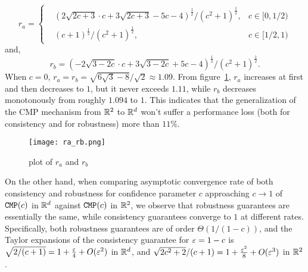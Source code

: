 \begin{equation*}
r_a=
\left\{
\begin{aligned}
&(2\sqrt{2c+3}\cdot c+3\sqrt{2c+3}-5c-4)^{\frac{1}{2}}/(c^2+1)^{\frac{1}{2}}, &c\in[0,1/2)\\
&(c+1)^{\frac{1}{2}}/(c^2+1)^{\frac{1}{2}},  &c\in[1/2,1)
\end{aligned}
\right.
\end{equation*}
and,
\begin{equation*}
r_b=(-2\sqrt{3-2c}\cdot c+3\sqrt{3-2c}+5c-4)^{\frac{1}{2}}/(c^2+1)^{\frac{1}{2}}.
\end{equation*}
When $c=0$, $r_a=r_b=\sqrt{6\sqrt{3}-8}/\sqrt{2}\approx1.09$. From figure~\ref{fig:plot of $r_a$ and $r_b$}, $r_a$ increases at first and then decreases to $1$, but it never exceeds $1.11$, while $r_b$ decreases monotonously from roughly $1.094$ to $1$. This indicates that the generalization of the CMP mechanism from $\mathbb{R}^2$ to $\mathbb{R}^d$ won't suffer a performance loss (both for consistency and for robustness) more than $11\%$.
\begin{figure}[htb] 
		\centering
		\texttt{[image: ra\_rb.png]}
		\caption{plot of $r_a$ and $r_b$}
\label{fig:plot of $r_a$ and $r_b$}		
\end{figure}

On the other hand, when comparing asymptotic convergence rate of both consistency and robustness for confidence parameter $c$ approaching $c\rightarrow 1$ of $\texttt{CMP}(c)$ in ${\mathbb R}^d$ against $\texttt{CMP}(c)$ in ${\mathbb R}^2$, we observe that robustness guarantees are essentially the same, while consistency guarantees converge to $1$ at different rates. Specifically, both robustness guarantees are of order $\Theta(1/(1-c))$, and the Taylor expansions of the consistency guarantee for $\varepsilon=1-c$ is  $\sqrt{2/(c+1)}=1+\frac{\varepsilon}{4}+O(\varepsilon^2)$ in ${\mathbb R}^d$, and 
$\sqrt{2c^2+2}/(c+1)=1+\frac{\varepsilon^2}{8}+O(\varepsilon^3)$ in ${\mathbb R}^2$.

